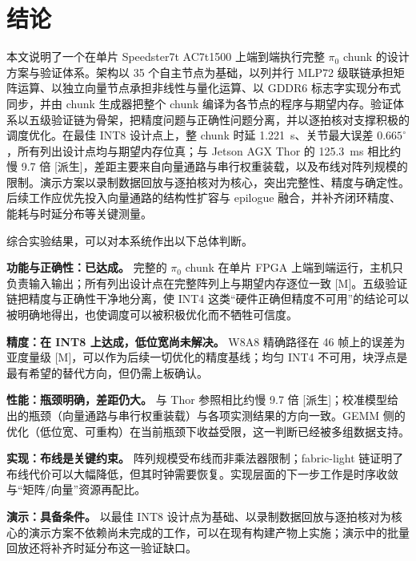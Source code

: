 \documentclass[a4paper,10.5pt]{ctexart}
\newcommand{\tM}{\textsf{[M]}}              %
\newcommand{\tD}{\textsf{[派生]}}           %
\newcommand{\pizero}{$\pi_0$}
\begin{document}
\section{结论}\label{sec:concl}


本文说明了一个在单片 Speedster7t AC7t1500 上端到端执行完整 \pizero{} chunk 的设计方案与验证体系。架构以 35 个自主节点为基础，以列并行 MLP72 级联链承担矩阵运算、以独立向量节点承担非线性与量化运算、以 GDDR6 标志字实现分布式同步，并由 chunk 生成器把整个 chunk 编译为各节点的程序与期望内存。验证体系以五级验证链为骨架，把精度问题与正确性问题分离，并以逐拍核对支撑积极的调度优化。在最佳 INT8 设计点上，整 chunk 时延 1.221~s、关节最大误差 $0.665^\circ$，所有列出设计点均与期望内存位真；与 Jetson AGX Thor 的 125.3~ms 相比约慢 9.7 倍 \tD，差距主要来自向量通路与串行权重装载，以及布线对阵列规模的限制。演示方案以录制数据回放与逐拍核对为核心，突出完整性、精度与确定性。后续工作应优先投入向量通路的结构性扩容与 epilogue 融合，并补齐闭环精度、能耗与时延分布等关键测量。


综合实验结果，可以对本系统作出以下总体判断。

\textbf{功能与正确性：已达成。} 完整的 \pizero{} chunk 在单片 FPGA 上端到端运行，主机只负责输入输出；所有列出设计点在完整阵列上与期望内存逐位一致 \tM。五级验证链把精度与正确性干净地分离，使 INT4 这类“硬件正确但精度不可用”的结论可以被明确地得出，也使调度可以被积极优化而不牺牲可信度。

\textbf{精度：在 INT8 上达成，低位宽尚未解决。} W8A8 精确路径在 46 帧上的误差为亚度量级 \tM，可以作为后续一切优化的精度基线；均匀 INT4 不可用，块浮点是最有希望的替代方向，但仍需上板确认。

\textbf{性能：瓶颈明确，差距仍大。} 与 Thor 参照相比约慢 9.7 倍 \tD；校准模型给出的瓶颈（向量通路与串行权重装载）与各项实测结果的方向一致。GEMM 侧的优化（低位宽、可重构）在当前瓶颈下收益受限，这一判断已经被多组数据支持。

\textbf{实现：布线是关键约束。} 阵列规模受布线而非乘法器限制；fabric-light 链证明了布线代价可以大幅降低，但其时钟需要恢复。实现层面的下一步工作是时序收敛与“矩阵/向量”资源再配比。

\textbf{演示：具备条件。} 以最佳 INT8 设计点为基础、以录制数据回放与逐拍核对为核心的演示方案不依赖尚未完成的工作，可以在现有构建产物上实施；演示中的批量回放还将补齐时延分布这一验证缺口。
\end{document}

